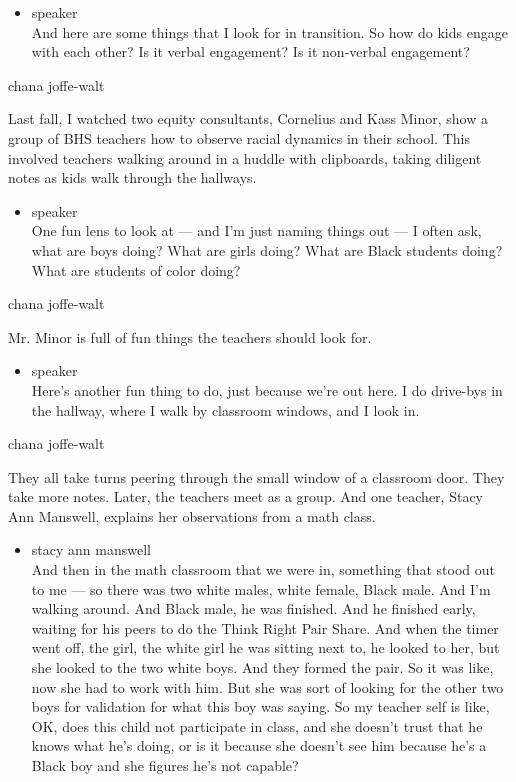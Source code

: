 \begin{itemize}
\tightlist
\item
  speaker\\
  And here are some things that I look for in transition. So how do kids
  engage with each other? Is it verbal engagement? Is it non-verbal
  engagement?
\end{itemize}

chana joffe-walt

Last fall, I watched two equity consultants, Cornelius and Kass Minor,
show a group of BHS teachers how to observe racial dynamics in their
school. This involved teachers walking around in a huddle with
clipboards, taking diligent notes as kids walk through the hallways.

\begin{itemize}
\tightlist
\item
  speaker\\
  One fun lens to look at --- and I'm just naming things out --- I often
  ask, what are boys doing? What are girls doing? What are Black
  students doing? What are students of color doing?
\end{itemize}

chana joffe-walt

Mr. Minor is full of fun things the teachers should look for.

\begin{itemize}
\tightlist
\item
  speaker\\
  Here's another fun thing to do, just because we're out here. I do
  drive-bys in the hallway, where I walk by classroom windows, and I
  look in.
\end{itemize}

chana joffe-walt

They all take turns peering through the small window of a classroom
door. They take more notes. Later, the teachers meet as a group. And one
teacher, Stacy Ann Manswell, explains her observations from a math
class.

\begin{itemize}
\tightlist
\item
  stacy ann manswell\\
  And then in the math classroom that we were in, something that stood
  out to me --- so there was two white males, white female, Black male.
  And I'm walking around. And Black male, he was finished. And he
  finished early, waiting for his peers to do the Think Right Pair
  Share. And when the timer went off, the girl, the white girl he was
  sitting next to, he looked to her, but she looked to the two white
  boys. And they formed the pair. So it was like, now she had to work
  with him. But she was sort of looking for the other two boys for
  validation for what this boy was saying. So my teacher self is like,
  OK, does this child not participate in class, and she doesn't trust
  that he knows what he's doing, or is it because she doesn't see him
  because he's a Black boy and she figures he's not capable?
\end{itemize}

